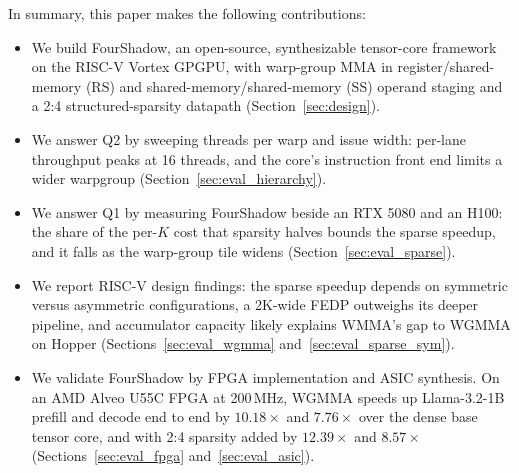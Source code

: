 In summary, this paper makes the following contributions:

\begin{itemize}
    \item We build FourShadow, an open-source, synthesizable tensor-core framework on the RISC-V Vortex GPGPU, with warp-group MMA in register/shared-memory (RS) and shared-memory/shared-memory (SS) operand staging and a 2:4 structured-sparsity datapath (Section~\ref{sec:design}).

    \item We answer Q2 by sweeping threads per warp and issue width: per-lane throughput peaks at 16 threads, and the core's instruction front end limits a wider warpgroup (Section~\ref{sec:eval_hierarchy}).

    \item We answer Q1 by measuring FourShadow beside an RTX 5080 and an H100: the share of the per-$K$ cost that sparsity halves bounds the sparse speedup, and it falls as the warp-group tile widens (Section~\ref{sec:eval_sparse}).

    \item We report RISC-V design findings: the sparse speedup depends on symmetric versus asymmetric configurations, a 2K-wide FEDP outweighs its deeper pipeline, and accumulator capacity likely explains WMMA's gap to WGMMA on Hopper (Sections~\ref{sec:eval_wgmma} and~\ref{sec:eval_sparse_sym}).

    \item We validate FourShadow by FPGA implementation and ASIC synthesis. On an AMD Alveo U55C FPGA at 200\,MHz, WGMMA speeds up Llama-3.2-1B prefill and decode end to end by $10.18\times$ and $7.76\times$ over the dense base tensor core, and with 2:4 sparsity added by $12.39\times$ and $8.57\times$ (Sections~\ref{sec:eval_fpga} and~\ref{sec:eval_asic}).%
\end{itemize}
